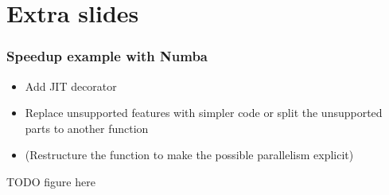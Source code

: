\section{Extra slides}

\begin{frame}
    \frametitle{Speedup example with Numba}
    \begin{itemize}
        \item Add JIT decorator
        \item Replace unsupported features with simpler code or split the unsupported parts to another function
        \item (Restructure the function to make the possible parallelism explicit)
    \end{itemize}
    TODO figure here
\end{frame}
